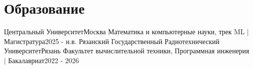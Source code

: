 \section{Образование}
\resumeSubHeadingListStart
\resumeSubheading
{Центральный Университет}{Москва}
{Математика и компьютерные науки, трек ML $|$ Магистратура}{2025 - н.в.}
\resumeSubheading
{Рязанский Государственный Радиотехнический Университет}{Рязань}
{Факультет вычислительной техники, Программная инженерия $|$ Бакалавриат}{2022 - 2026}
\resumeSubHeadingListEnd
